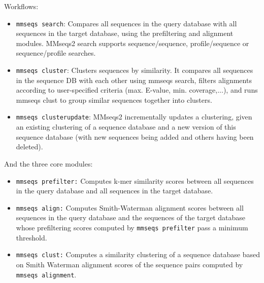 \documentclass[11pt,a4paper]{scrreprt}
\begin{document}
Workflows:
\begin{itemize}
\item \texttt{mmseqs search}: Compares all sequences in the query database with all sequences in the target database, using the prefiltering and alignment modules. MMseqs2 search supports sequence/sequence, profile/sequence or sequence/profile searches.
\item \texttt{mmseqs cluster}:  Clusters sequences by similarity. It compares all sequences in the sequence DB with each other using mmseqs search, filters alignments according to user-specified criteria (max. E-value, min. coverage,...),   and runs mmseqs clust to group similar sequences together into clusters.
\item \texttt{mmseqs clusterupdate}: MMseqs2 incrementally updates a clustering, given an existing clustering of a sequence database and a new version of this sequence database (with new sequences being added and others having been deleted).
\end{itemize}

And the three core modules:
\begin{itemize}
\item \texttt{mmseqs prefilter:} Computes k-mer similarity scores between all sequences in the query database and all sequences in the target database.
\item \texttt{mmseqs align:} Computes Smith-Waterman alignment scores between all sequences in the query database and the sequences of the target database whose prefiltering scores computed by \texttt{mmseqs prefilter} pass a minimum threshold.
\item \texttt{mmseqs clust:} Computes a similarity clustering of a sequence database based on Smith Waterman alignment scores of the sequence pairs computed by \texttt{mmseqs alignment}.
\end{itemize}
\end{document}
